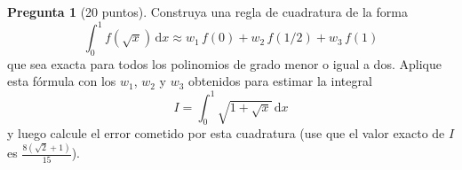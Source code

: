\documentclass[letterpaper,12pt]{article}
\theoremstyle{definition}
\newtheorem{question}{Pregunta}
\numberwithin{equation}{question}
\begin{document}
\newpage

\begin{question}[20 puntos]
Construya una regla de cuadratura de la forma
%
\begin{equation}\label{weirdRule}
\int_0^1 f(\sqrt{x})\,\mathrm{d}x \approx w_1 \, f(0) + w_2 \, f(1/2) + w_3 \, f(1)
\end{equation}
%
que sea exacta para todos los polinomios de grado menor o igual a dos.
Aplique esta f\'ormula con los $w_1$, $w_2$ y $w_3$ obtenidos para estimar la integral
%
\begin{equation}
I = \int_0^1\sqrt{1+\sqrt{x}}\,\mathrm{d}x
\end{equation}
%
y luego calcule el error cometido por esta cuadratura (use que el valor exacto de $I$ es $\frac{8(\sqrt{2}+1)}{15}$).
\end{question}
\end{document}
